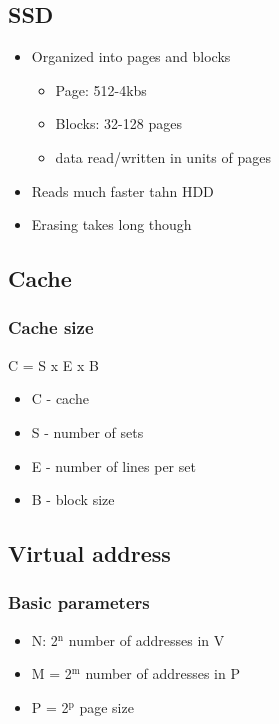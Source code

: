 \documentclass[11pt]{article}
\begin{document}
\subsection{SSD}
\label{sec:orgheadline10}
\begin{itemize}
\item Organized into pages and blocks
\begin{itemize}
\item Page: 512-4kbs
\item Blocks: 32-128 pages
\item data read/written in units of pages
\end{itemize}
\item Reads much faster tahn HDD
\item Erasing takes long though
\end{itemize}

\subsection{Cache}
\label{sec:orgheadline12}
\subsubsection{Cache size}
\label{sec:orgheadline11}
C = S x E x B
\begin{itemize}
\item C - cache
\item S - number of sets
\item E - number of lines per set
\item B - block size
\end{itemize}
\subsection{Virtual address}
\label{sec:orgheadline15}
\subsubsection{Basic parameters}
\label{sec:orgheadline13}
\begin{itemize}
\item N: 2\(^{\text{n}}\) number of addresses in V
\item M = 2\(^{\text{m}}\) number of addresses in P
\item P = 2\(^{\text{p}}\) page size
\end{itemize}
\end{document}
